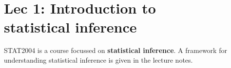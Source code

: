 \chapter[Lec 1: Introduction to statistical inference]{Lec 1: Introduction to \\ statistical inference}

STAT2004 is a course focussed on \textbf{statistical inference}. 
A framework for understanding statistical inference is given in 
the lecture notes. 